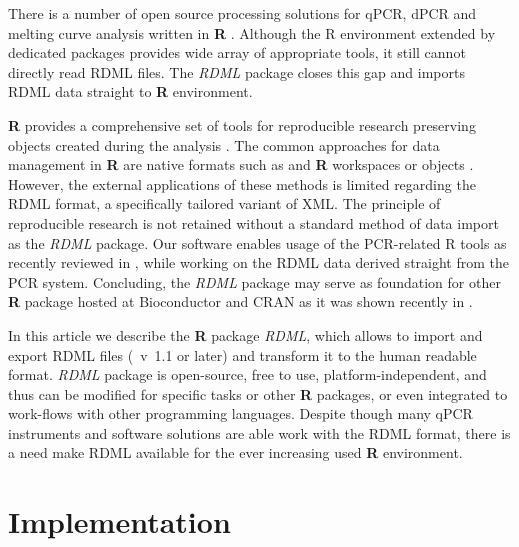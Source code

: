 \documentclass{bioinfo}
\begin{document}
	There is a number of open source processing solutions for qPCR, dPCR and melting curve 
	analysis written in \textbf{R} \cite{pabinger_2014, ritz_qpcr_2008, roediger_RJ_2013, 
	roediger2015chippcr}. Although the R environment extended by 
	dedicated packages provides wide array of appropriate tools, it still cannot 
	directly read RDML files. The \textit{RDML} package closes this gap and imports 
	RDML data straight to \textbf{R} environment.
	
	\textbf{R} provides a comprehensive set of tools for reproducible 
	research preserving objects created during the analysis 
	\cite{roediger2015r,roediger2015chippcr}. The common approaches for data 
	management in \textbf{R} are native formats such as and \textbf{R} 
	workspaces or objects \cite{roediger_rkward_2012}. However, the external 
	applications of these methods is limited regarding the RDML format, a 
	specifically tailored variant of XML. The principle of reproducible research is 
	not retained without a standard method of data import as the \textit{RDML} 
	package. Our software enables usage of the PCR-related R tools as recently 
	reviewed in \cite{pabinger_2014}, while working on the RDML data derived 
	straight from the PCR system. Concluding, the \textit{RDML} package may serve as 
	foundation for other \textbf{R} package hosted at Bioconductor 
	\cite{gentleman_2004} and CRAN as it was shown recently in \cite{roediger2015r}.
	
	In this article we describe the \textbf{R} package \textit{RDML}, which allows to
	import and export RDML files (~v~1.1 or later) and transform it to the
	human readable format. \textit{RDML} package is open-source, free to use,
	platform-independent, and thus can be modified for specific tasks or other
	\textbf{R} packages, or even integrated to work-flows with other programming
	languages. Despite though many qPCR instruments and software solutions are able
	work with the RDML format, there is a need make RDML available for the ever
	increasing used \textbf{R} environment.
	
	\section{Implementation}
	
\end{document}
